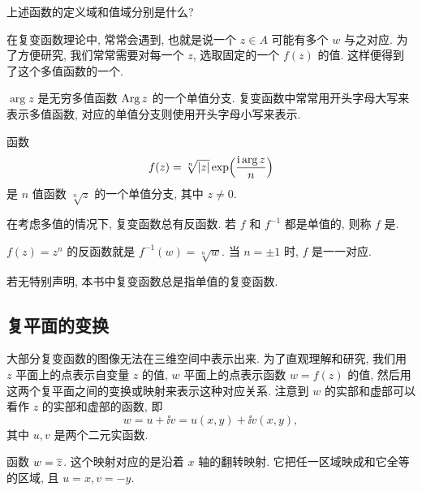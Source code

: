 \begin{exercise}
  上述函数的定义域和值域分别是什么?
\end{exercise}

在复变函数理论中, 常常会遇到, 也就是说一个 $z\in A$ 可能有多个 $w$ 与之对应.
为了方便研究, 我们常常需要对每一个 $z$, 选取固定的一个 $f(z)$ 的值.
这样便得到了这个多值函数的一个.
\begin{exampleenum}
  \item $\arg z$ 是无穷多值函数 $\operatorname{Arg} z$ 的一个单值分支.
  复变函数中常常用开头字母大写来表示多值函数, 对应的单值分支则使用开头字母小写来表示.
  \item 函数
  \[
    f(z)=\sqrt[n]{\lvert z\rvert}\exp\Bigl(\frac{\mathrm{i}\arg z}n\Bigr)
  \]
  是 $n$ 值函数 $\sqrt[n]z$ 的一个单值分支, 其中 $z\neq 0$.
\end{exampleenum}

在考虑多值的情况下, 复变函数总有反函数.
若 $f$ 和 $f^{-1}$ 都是单值的, 则称 $f$ 是.

\begin{example}
  $f(z)=z^n$ 的反函数就是 $f^{-1}(w)=\sqrt[n]{w}$.
  {当 $n=\pm1$ 时, $f$ 是一一对应.}
\end{example}

若无特别声明, 本书中\alert{复变函数总是指单值的复变函数}.


\subsection{复平面的变换}

大部分复变函数的图像无法在三维空间中表示出来.
为了直观理解和研究, 我们用 $z$ 平面上的点表示自变量 $z$ 的值, $w$ 平面上的点表示函数 $w=f(z)$ 的值, 然后用这两个复平面之间的变换或映射来表示这种对应关系.
注意到 $w$ 的实部和虚部可以看作 $z$ 的实部和虚部的函数, 即
\[
  w=u+\ii v=u(x,y)+\ii v(x,y),
\]
其中 $u,v$ 是两个二元实函数.

\begin{example}
  函数 $w=\overline z$.
  这个映射对应的是沿着 $x$ 轴的翻转映射.
  它把任一区域映成和它全等的区域, 且 $u=x,v=-y$.
\end{example}


